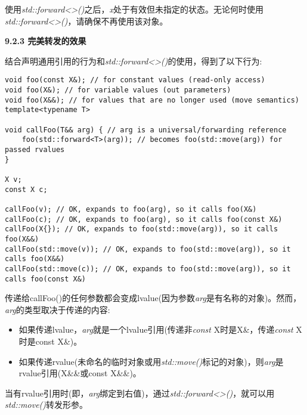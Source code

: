 使用\textit{std::forward<>()}之后，\textit{x}处于有效但未指定的状态。无论何时使用\textit{std::forward<>()}，请确保不再使用该对象。\par

\hspace*{\fill} \par %
\textbf{9.2.3 完美转发的效果}

结合声明通用引用的行为和\textit{std::forward<>()}的使用，得到了以下行为:\par

\begin{lstlisting}[caption={}]
void foo(const X&); // for constant values (read-only access)
void foo(X&); // for variable values (out parameters)
void foo(X&&); // for values that are no longer used (move semantics)
template<typename T>

void callFoo(T&& arg) { // arg is a universal/forwarding reference
	foo(std::forward<T>(arg)); // becomes foo(std::move(arg)) for passed rvalues
}

X v;
const X c;

callFoo(v); // OK, expands to foo(arg), so it calls foo(X&)
callFoo(c); // OK, expands to foo(arg), so it calls foo(const X&)
callFoo(X{}); // OK, expands to foo(std::move(arg)), so it calls foo(X&&)
callFoo(std::move(v)); // OK, expands to foo(std::move(arg)), so it calls foo(X&&)
callFoo(std::move(c)); // OK, expands to foo(std::move(arg)), so it calls foo(const X&)
\end{lstlisting}

传递给callFoo()的任何参数都会变成lvalue(因为参数\textit{arg}是有名称的对象)。然而，\textit{arg}的类型取决于传递的内容:\par

\begin{itemize}
	\item 如果传递lvalue，\textit{arg}就是一个lvalue引用(传递非\textit{const} X时是X\&，传递\textit{const} X时是const X\&)。
	\item 如果传递rvalue(未命名的临时对象或用\textit{std::move()}标记的对象)，则\textit{arg}是rvalue引用(X\&\&或const X\&\&)。
\end{itemize}

当有rvalue引用时(即，\textit{arg}绑定到右值)，通过\textit{std::forward<>()}，就可以用\textit{std::move()}转发形参。\par




















